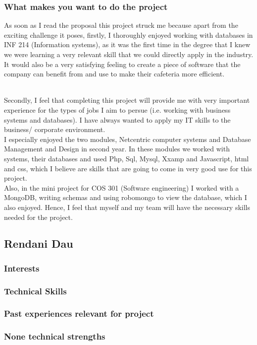 \documentclass[hidelinks, 12pt, oneside]{article}
\begin{document}
\subsubsection{What makes you want to do the project} 
As soon as I read the proposal this project struck me because apart from the exciting challenge it poses, firstly, I thoroughly enjoyed working with databases in INF 214 (Information systems), as it was the first time in the degree that I knew we were learning a very relevant skill that we could directly apply in the industry. It would also be a very satisfying feeling to create a piece of software that the company can benefit from and use to make their cafeteria more efficient.

\\Secondly, I feel that completing this project will provide me with very important experience for the types of jobs I aim to persue (i.e. working with business systems and databases). I have always wanted to apply my IT skills to the business/ corporate environment. 
\\
I especially enjoyed the two modules, Netcentric computer systems and Database Management and Design in second year. In these modules we worked with systems, their databases and used Php, Sql, Mysql, Xxamp and Javascript, html and css, which I believe are skills that are going to come in very good use for this project. 
\\
Also, in the mini project for COS 301 (Software engineering) I worked with a MongoDB, writing schemas and using robomongo to view the database, which I also enjoyed. Hence, I feel that myself and my team will have the necessary skills needed for the project. 
\\

\subsection{Rendani Dau}
\subsubsection{Interests}
\subsubsection{Technical Skills}
\subsubsection{Past experiences relevant for project}
\subsubsection{None technical strengths}
\end{document}
